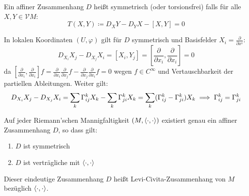 \documentclass[a4paper,twoside,DIV15,BCOR12mm]{scrbook}
\renewcommand{\da}{\coloneqq}
\newcommand{\V}{\mathcal V}
\begin{document}
\begin{definition}
Ein affiner Zusammenhang $D$ heißt symmetrisch (oder torsionsfrei) falls für alle $X,Y\in \V M$:
\[
T(X,Y) \da D_XY - D_YX - [X,Y] = 0
\]
\end{definition}

\begin{bemerkung}
In lokalen Koordinaten $(U,\varphi)$ gilt für $D$ symmetrisch und Basisfelder $X_i = \frac\partial{\partial x^i}$:
\[
D_{X_i} X_j - D_{X_j}X_i  = [X_i,Y_j] = \left[\frac{\partial}{\partial x_i},\frac{\partial}{\partial x_i}\right] = 0
\]
da $\left[\frac{\partial}{\partial x_i},\frac{\partial}{\partial x_i}\right] f = \frac{\partial}{\partial x_i} \frac{\partial}{\partial x_j} f - \frac{\partial}{\partial x_j} \frac{\partial}{\partial x_i} f = 0$ wegen $f\in C^\infty$ und Vertauschbarkeit der partiellen Ableitungen. Weiter gilt:
\[
D_{X_i} X_j - D_{X_j}X_i  = \sum_k \Gamma_{ij}^kX_k - \sum_k \Gamma_{ji}^kX_k = \sum_k( \Gamma_{ij}^k - \Gamma_{ji}^k) X_k \implies \Gamma_{ij}^k = \Gamma_{ji}^k
\]
\end{bemerkung}

\begin{satz}
Auf jeder Riemann’schen Mannigfaltigkeit $(M,\langle\cdot,\cdot\rangle)$ existiert genau ein affiner Zusammenhang $D$, so dass gilt:
\begin{enumerate}
\item $D$ ist symmetrisch
\item $D$ ist verträgliche mit $\langle\cdot,\cdot\rangle$
\end{enumerate}
\end{satz}

Dieser eindeutige Zusammenhang $D$ heißt Levi-Civita-Zusammenhang von $M$ bezüglich $\langle\cdot,\cdot\rangle$.
\end{document}
